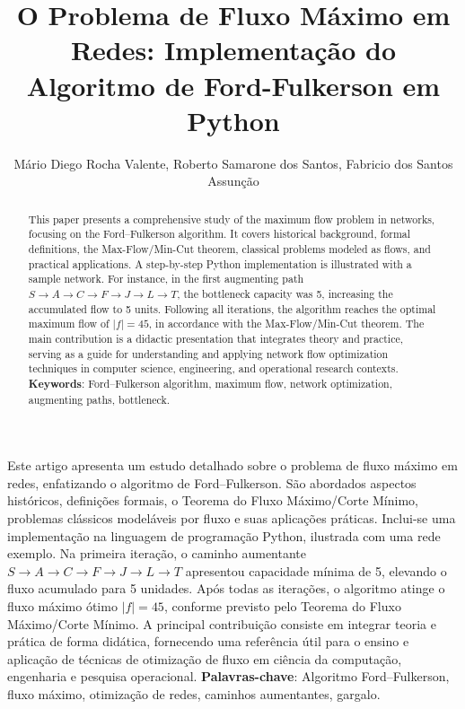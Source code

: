 \documentclass[12pt]{article}
\title{O Problema de Fluxo Máximo em Redes: Implementação do Algoritmo de Ford-Fulkerson em Python}
\author{Mário Diego Rocha Valente\inst{1}, Roberto Samarone dos Santos\inst{2}, Fabricio dos Santos Assunção\inst{1}}
\begin{document}
 
\maketitle

\begin{abstract}
 This paper presents a comprehensive study of the maximum flow problem in networks, focusing on the Ford–Fulkerson algorithm. It covers historical background, formal definitions, the Max-Flow/Min-Cut theorem, classical problems modeled as flows, and practical applications. A step-by-step Python implementation is illustrated with a sample network. For instance, in the first augmenting path $S \rightarrow A \rightarrow C \rightarrow F \rightarrow J \rightarrow L \rightarrow T$, the bottleneck capacity was 5, increasing the accumulated flow to 5 units. Following all iterations, the algorithm reaches the optimal maximum flow of $|f|=45$, in accordance with the Max-Flow/Min-Cut theorem. The main contribution is a didactic presentation that integrates theory and practice, serving as a guide for understanding and applying network flow optimization techniques in computer science, engineering, and operational research contexts.
 \vskip0.3cm
  \textbf{Keywords}: Ford–Fulkerson algorithm, maximum flow, network optimization, augmenting paths, bottleneck.
\end{abstract}
     
\begin{resumo} 
Este artigo apresenta um estudo detalhado sobre o problema de fluxo máximo em redes, enfatizando o algoritmo de Ford–Fulkerson. São abordados aspectos históricos, definições formais, o Teorema do Fluxo Máximo/Corte Mínimo, problemas clássicos modeláveis por fluxo e suas aplicações práticas. Inclui-se uma implementação na linguagem de programação Python, ilustrada com uma rede exemplo. Na primeira iteração, o caminho aumentante 
$S \rightarrow A \rightarrow C \rightarrow F \rightarrow J \rightarrow L \rightarrow T$ apresentou capacidade mínima de 5, elevando o fluxo acumulado para 5 unidades. Após todas as iterações, o algoritmo atinge o fluxo máximo ótimo $|f|=45$, conforme previsto pelo Teorema do Fluxo Máximo/Corte Mínimo. A principal contribuição consiste em integrar teoria e prática de forma didática, fornecendo uma referência útil para o ensino e aplicação de técnicas de otimização de fluxo em ciência da computação, engenharia e pesquisa operacional. \vskip0.3cm
 \textbf{Palavras-chave}: Algoritmo Ford–Fulkerson, fluxo máximo, otimização de redes, caminhos aumentantes, gargalo.
\end{resumo}
\end{document}
